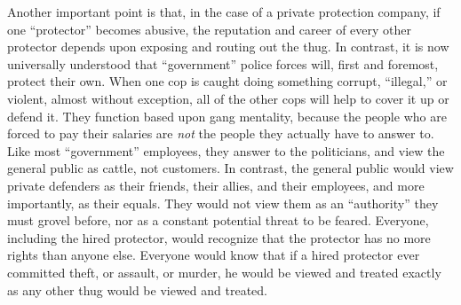 \documentclass{book}
\begin{document}
Another important point is that, in the case of a private protection company, if one \enquote{protector} becomes abusive, the reputation and career of every other protector depends upon exposing and routing out the thug. In contrast, it is now universally understood that \enquote{government} police forces will, first and foremost, protect their own. When one cop is caught doing something corrupt, \enquote{illegal,} or violent, almost without exception, all of the other cops will help to cover it up or defend it. They function based upon gang mentality, because the people who are forced to pay their salaries are \emph{not} the people they actually have to answer to. Like most \enquote{government} employees, they answer to the politicians, and view the general public as cattle, not customers. In contrast, the general public would view private defenders as their friends, their allies, and their employees, and more importantly, as their equals. They would not view them as an \enquote{authority} they must grovel before, nor as a constant potential threat to be feared. Everyone, including the hired protector, would recognize that the protector has no more rights than anyone else. Everyone would know that if a hired protector ever committed theft, or assault, or murder, he would be viewed and treated exactly as any other thug would be viewed and treated.
\end{document}
